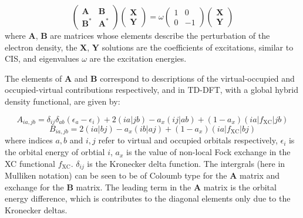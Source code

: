 \begin{equation}
    \begin{pmatrix}
        \mathbf{A}   & \mathbf{B} \\
        \mathbf{B}^\ast  & \mathbf{A}^\ast
    \end{pmatrix}
    \begin{pmatrix}
        \mathbf{X} \\
        \mathbf{Y}
    \end{pmatrix}
    = 
    \omega
    \begin{pmatrix}
        1 & 0 \\
        0 & -1
    \end{pmatrix}
    \begin{pmatrix}
        \mathbf{X} \\
        \mathbf{Y}
    \end{pmatrix}
\end{equation}
%
where $\mathbf{A}$, $\mathbf{B}$ are matrices whose elements describe the perturbation
of the electron density, the $\mathbf{X}$, $\mathbf{Y}$ solutions are the 
coefficients of excitations, similar to CIS, and eigenvalues $\omega$ are the 
excitation energies.

The elements of $\mathbf{A}$ and $\mathbf{B}$ correspond to descriptions of the
virtual-occupied and occupied-virtual contributions respectively, and in TD-DFT, 
with a global hybrid density functional, are given by:

\begin{equation}
A_{ia,jb} = \delta_{ij} \delta_{ab} \left( \epsilon_a - \epsilon_i \right) + 2\left(ia|jb\right) - a_x\left(ij|ab\right) + (1- a_x)\left(ia|f_{\text{XC}}|jb\right)
\end{equation}
%
\begin{equation}
B_{ia,jb} = 2\left(ia|bj\right) - a_x\left(ib|aj\right) + (1- a_x)\left(ia|f_{\text{XC}}|bj\right)
\end{equation}
%
where indices $a,b$ and $i,j$ refer to virtual and occupied orbitals respectively,
$\epsilon_i$ is the orbital energy of orbtial $i$, $a_x$ is the value of non-local
Fock exchange in the XC functional $f_{\text{XC}}$. $\delta_{ij}$ is the Kronecker
delta function. The intergrals (here in Mulliken notation) can be seen to be of
Coloumb type for the $\mathbf{A}$ matrix and exchange for the $\mathbf{B}$ matrix. 
The leading term in the $\mathbf{A}$ matrix is the orbital energy difference,
which is contributes to the diagonal elements only due to the Kronecker deltas.

